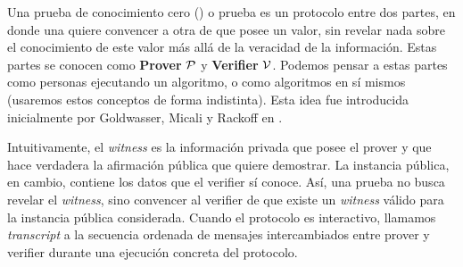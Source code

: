 
Una prueba de conocimiento cero (\ZeroKnowledgeProof) o prueba \ZK es un protocolo entre dos partes, en donde una quiere convencer a otra de que posee un valor, sin revelar nada sobre el conocimiento de este valor más allá de la veracidad de la información. Estas partes se conocen como \textbf{Prover} $\mathcal{P}$ y \textbf{Verifier} $\mathcal{V}$. Podemos pensar a estas partes como personas ejecutando un algoritmo, o como algoritmos en sí mismos (usaremos estos conceptos de forma indistinta). Esta idea fue introducida inicialmente por Goldwasser, Micali y Rackoff en \cite{DBLP:journals/siamcomp/GoldwasserMR89}.

Intuitivamente, el \textit{witness} es la información privada que posee el prover y que hace verdadera la afirmación pública que quiere demostrar. La instancia pública, en cambio, contiene los datos que el verifier sí conoce. Así, una prueba \ZK no busca revelar el \textit{witness}, sino convencer al verifier de que existe un \textit{witness} válido para la instancia pública considerada. Cuando el protocolo es interactivo, llamamos \textit{transcript} a la secuencia ordenada de mensajes intercambiados entre prover y verifier durante una ejecución concreta del protocolo.

